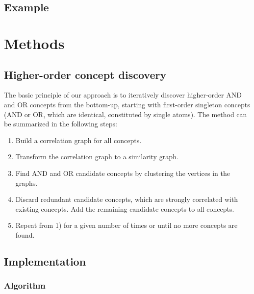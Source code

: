 \documentclass[conference]{IEEEtran}
\begin{document}
\subsection{Example}


\section{Methods}
\label{sec:methods}


\subsection{Higher-order concept discovery}
\label{subsec:conceptDiscovery}

The basic principle of our approach is to iteratively discover higher-order AND and OR concepts from the bottom-up,
starting with first-order singleton concepts (AND or OR, which are identical, constituted by single atoms). 
The method can be summarized in the following steps:

\begin{enumerate}
\item Build a correlation graph for all concepts.
\item Transform the correlation graph to a similarity graph.
\item Find AND and OR candidate concepts by clustering the vertices in the graphs.
\item Discard redundant candidate concepts, which are strongly correlated with existing concepts.
Add the remaining candidate concepts to all concepts.
\item Repeat from 1) for a given number of times or until no more concepts are found.
\end{enumerate}

\subsection{Implementation}
\label{subsec:algorithmsAndImplementation}

\subsubsection{Algorithm}
\label{subsec:algorithm}
\end{document}
